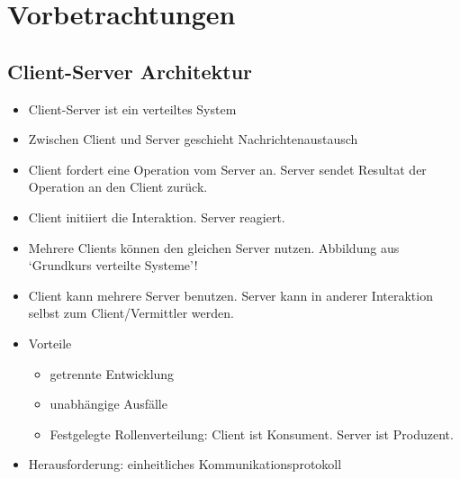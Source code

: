 \section{Vorbetrachtungen}
\subsection{Client-Server Architektur}
\begin{itemize}
  \item Client-Server ist ein verteiltes System
  \item Zwischen Client und Server geschieht Nachrichtenaustausch
  \item Client fordert eine Operation vom Server an. Server sendet Resultat der Operation an den Client zurück.
  \item Client initiiert die Interaktion. Server reagiert.
  \item Mehrere Clients können den gleichen Server nutzen. Abbildung aus `Grundkurs verteilte Systeme'!
  \item Client kann mehrere Server benutzen. Server kann in anderer Interaktion selbst zum Client/Vermittler werden.
  \item Vorteile
    \begin{itemize}
      \item getrennte Entwicklung
      \item unabhängige Ausfälle
      \item Festgelegte Rollenverteilung: Client ist Konsument. Server ist Produzent.
    \end{itemize}
  \item Herausforderung: einheitliches Kommunikationsprotokoll
\end{itemize}